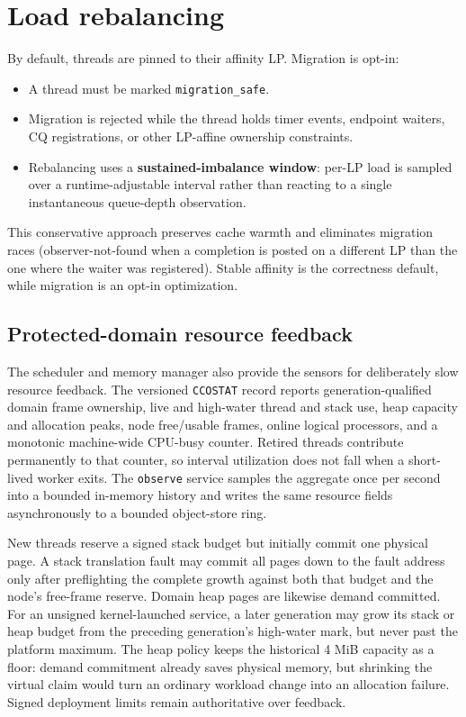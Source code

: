 \section{Load rebalancing}

By default, threads are pinned to their affinity LP. Migration is opt-in:

\begin{itemize}
    \item A thread must be marked \texttt{migration\_safe}.
    \item Migration is rejected while the thread holds timer events, endpoint
        waiters, CQ registrations, or other LP-affine ownership constraints.
    \item Rebalancing uses a \textbf{sustained-imbalance window}: per-LP load is
        sampled over a runtime-adjustable interval rather than reacting to a
        single instantaneous queue-depth observation.
\end{itemize}

This conservative approach preserves cache warmth and eliminates migration races
(observer-not-found when a completion is posted on a different LP than the one
where the waiter was registered). Stable affinity is the correctness default, while
migration is an opt-in optimization.

\subsection{Protected-domain resource feedback}

The scheduler and memory manager also provide the sensors for deliberately
slow resource feedback. The versioned \texttt{CCOSTAT} record reports
generation-qualified domain frame ownership, live and high-water thread and
stack use, heap capacity and allocation peaks, node free/usable frames, online
logical processors, and a monotonic machine-wide CPU-busy counter. Retired
threads contribute permanently to that counter, so interval utilization does
not fall when a short-lived worker exits. The \texttt{observe} service samples
the aggregate once per second into a bounded in-memory history and writes the
same resource fields asynchronously to a bounded object-store ring.

New threads reserve a signed stack budget but initially commit one physical
page. A stack translation fault may commit all pages down to the fault address
only after preflighting the complete growth against both that budget and the
node's free-frame reserve. Domain heap pages are likewise demand committed.
For an unsigned kernel-launched service, a later generation may grow its stack
or heap budget from the preceding generation's high-water mark, but never past
the platform maximum. The heap policy keeps the historical 4 MiB capacity as a
floor: demand commitment already saves physical memory, but shrinking the
virtual claim would turn an ordinary workload change into an allocation
failure. Signed deployment limits remain authoritative over feedback.

